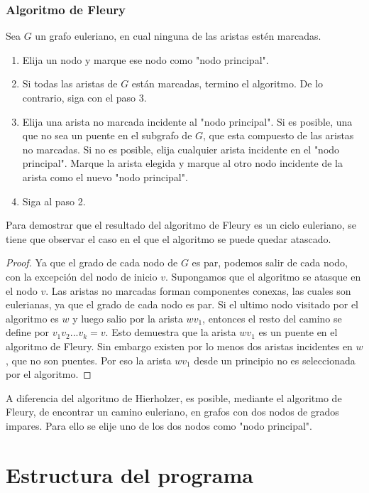 \documentclass[12pt]{article}
\begin{document}
\subsubsection{Algoritmo de Fleury}
Sea $G$ un grafo euleriano, en cual ninguna de las aristas estén marcadas.
\begin{enumerate}
\item Elija un nodo y marque ese nodo como "nodo principal".
\item Si todas las aristas de $G$ están marcadas, termino el algoritmo. De lo contrario, siga con el paso 3.
\item Elija una arista no marcada incidente al "nodo principal". Si es posible, una que no sea un puente en el subgrafo de $G$, que esta compuesto de las aristas no marcadas. Si no es posible, elija cualquier arista incidente en el "nodo principal". Marque la arista elegida y marque al otro nodo incidente de la arista como el nuevo "nodo principal".
\item Siga al paso 2.
\end{enumerate}
Para demostrar que el resultado del algoritmo de Fleury es un ciclo euleriano, se tiene que observar el caso en el que el algoritmo se puede quedar atascado.
\begin{proof}
Ya que el grado de cada nodo de $G$ es par, podemos salir de cada nodo, con la excepción del nodo de inicio $v$. Supongamos que el algoritmo se atasque en el nodo $v$. Las aristas no marcadas forman componentes conexas, las cuales son eulerianas, ya que el grado de cada nodo es par. Si el ultimo nodo visitado por el algoritmo es $w$ y luego salio por la arista $wv_{1}$, entonces el resto del camino se define por $v_{1}v_{2}...v_{k}=v$. Esto demuestra que la arista $wv_{1}$ es un puente en el algoritmo de Fleury. Sin embargo existen por lo menos dos aristas incidentes en $w$, que no son puentes. Por eso la arista $wv_{1}$ desde un principio no es seleccionada por el algoritmo.
\end{proof}
A diferencia del algoritmo de Hierholzer, es posible, mediante el algoritmo de Fleury, de encontrar un camino euleriano, en grafos con dos nodos de grados impares. Para ello se elije uno de los dos nodos como "nodo principal".
\newpage
\section{Estructura del programa}
\end{document}
